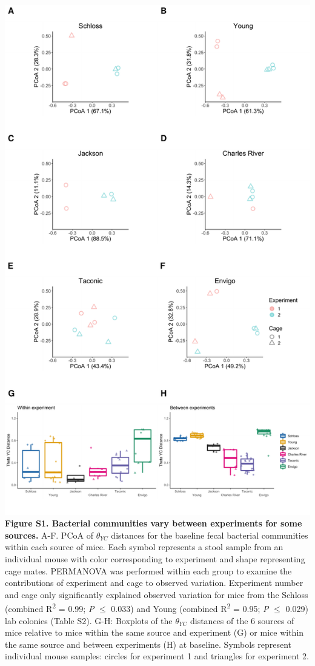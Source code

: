 \documentclass[11pt,]{article}
\begin{document}
\includegraphics{figure_S1.pdf} \textbf{Figure S1. Bacterial communities
vary between experiments for some sources.} A-F. PCoA of \(\theta_{YC}\)
distances for the baseline fecal bacterial communities within each
source of mice. Each symbol represents a stool sample from an individual
mouse with color corresponding to experiment and shape representing cage
mates. PERMANOVA was performed within each group to examine the
contributions of experiment and cage to observed variation. Experiment
number and cage only significantly explained observed variation for mice
from the Schloss (combined R\textsuperscript{2} = 0.99; \emph{P} \(\le\)
0.033) and Young (combined R\textsuperscript{2} = 0.95; \emph{P} \(\le\)
0.029) lab colonies (Table S2). G-H: Boxplots of the \(\theta_{YC}\)
distances of the 6 sources of mice relative to mice within the same
source and experiment (G) or mice within the same source and between
experiments (H) at baseline. Symbols represent individual mouse samples:
circles for experiment 1 and triangles for experiment 2.
\end{document}
